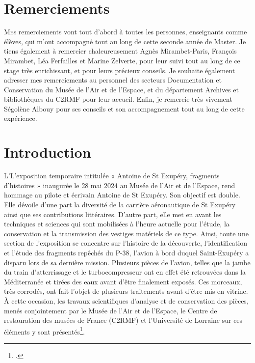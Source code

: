 \documentclass[a4paper,12pt,twoside]{book}
\newcommand{\clearemptydoublepage}{\newpage{\pagestyle{empty}\cleardoublepage}}
\newcommand\mychapter[1]{%
  \chapter*{#1}%
  \markright{\MakeUppercase{#1}}%
}
\begin{document}
\clearemptydoublepage

\mychapter{Remerciements}
\lettrine{M}es remerciements vont tout d'abord à toutes les personnes, enseignants comme élèves, qui m'ont accompagné tout au long de cette seconde année de Master. Je tiens également à remercier chaleureusement Agnès Mirambet-Paris, François Mirambet, Léa Ferfailles et Marine Zelverte, pour leur suivi tout au long de ce stage très enrichissant, et pour leurs précieux conseils. Je souhaite également adresser mes remerciements au personnel des secteurs Documentation et Conservation du Musée de l'Air et de l'Espace, et du département Archives et bibliothèques du C2RMF pour leur accueil. Enfin, je remercie très vivement Ségolène Albouy pour ses conseils et son accompagnement tout au long de cette expérience. 

\clearemptydoublepage

\printbibliography[keyword={jumeauNumérique},title={Jumeau numérique}]
\printbibliography[keyword={exemple},title={Exemples}]
\printbibliography[keyword={gestionDonnee},title={Gestion des données}]
\printbibliography[keyword={technique},title={Modélisation }]
\printbibliography[keyword={divers},title={Divers}]

\clearemptydoublepage

\mychapter{Introduction}
\lettrine{L}{'}L'exposition temporaire intitulée « Antoine de St Exupéry, fragments d'histoires » inaugurée le 28 mai 2024 au Musée de l'Air et de l'Espace, rend hommage au pilote et écrivain Antoine de St Exupéry. Son objectif est double. Elle dévoile d'une part la diversité de la carrière aéronautique de St Exupéry ainsi que ses contributions littéraires. D'autre part, elle met en avant les techniques et sciences qui sont mobilisées à l'heure actuelle pour l'étude, la conservation et la transmission des vestiges matériels de ce type. Ainsi, toute une section de l'exposition se concentre sur l'histoire de la découverte, l'identification et l'étude des fragments repêchés du P-38, l'avion à bord duquel Saint-Exupéry a disparu lors de sa dernière mission. Plusieurs pièces de l'avion, telles que la jambe du train d'atterrissage et le turbocompresseur ont en effet été retrouvées dans la Méditerranée et tirées des eaux avant d'être finalement exposés. Ces morceaux, très corrodés, ont fait l'objet de plusieurs traitements avant d'être mis en vitrine. À cette occasion, les travaux scientifiques d'analyse et de conservation des pièces, menés conjointement par le Musée de l’Air et de l’Espace, le Centre de restauration des musées de France (C2RMF) et l'Université de Lorraine sur ces éléments y sont présentés\footcite{ExpositiondossierAntoineSaintExupery2024}.
\end{document}

